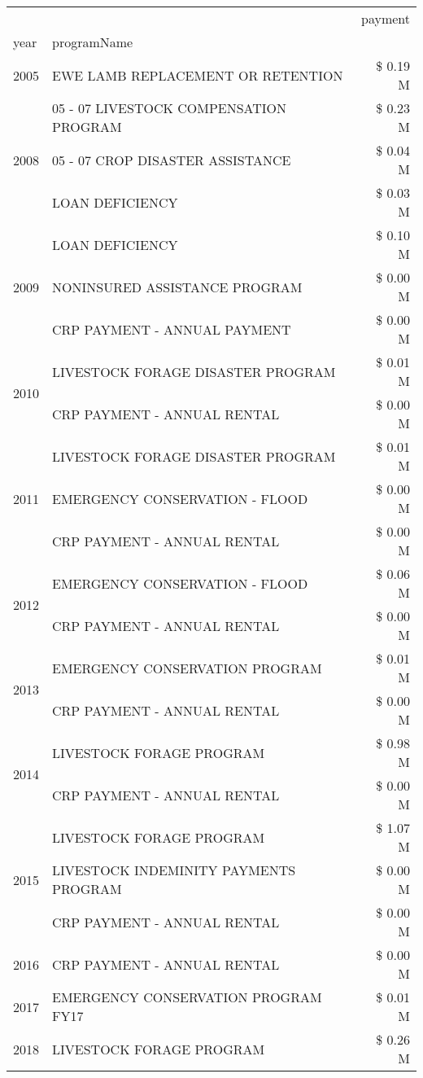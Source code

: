 \begin{tabular}{llr}
\toprule
 &  & payment \\
year & programName &  \\
\midrule
2005 & EWE LAMB REPLACEMENT OR RETENTION & \$ 0.19 M \\
\cline{1-3}
\multirow[t]{3}{*}{2008} & 05 - 07 LIVESTOCK COMPENSATION PROGRAM & \$ 0.23 M \\
 & 05 - 07 CROP DISASTER ASSISTANCE & \$ 0.04 M \\
 & LOAN DEFICIENCY & \$ 0.03 M \\
\cline{1-3}
\multirow[t]{3}{*}{2009} & LOAN DEFICIENCY & \$ 0.10 M \\
 & NONINSURED ASSISTANCE PROGRAM & \$ 0.00 M \\
 & CRP PAYMENT - ANNUAL PAYMENT & \$ 0.00 M \\
\cline{1-3}
\multirow[t]{2}{*}{2010} & LIVESTOCK FORAGE DISASTER PROGRAM & \$ 0.01 M \\
 & CRP PAYMENT - ANNUAL RENTAL & \$ 0.00 M \\
\cline{1-3}
\multirow[t]{3}{*}{2011} & LIVESTOCK FORAGE DISASTER PROGRAM & \$ 0.01 M \\
 & EMERGENCY CONSERVATION - FLOOD & \$ 0.00 M \\
 & CRP PAYMENT - ANNUAL RENTAL & \$ 0.00 M \\
\cline{1-3}
\multirow[t]{2}{*}{2012} & EMERGENCY CONSERVATION - FLOOD & \$ 0.06 M \\
 & CRP PAYMENT - ANNUAL RENTAL & \$ 0.00 M \\
\cline{1-3}
\multirow[t]{2}{*}{2013} & EMERGENCY CONSERVATION PROGRAM & \$ 0.01 M \\
 & CRP PAYMENT - ANNUAL RENTAL & \$ 0.00 M \\
\cline{1-3}
\multirow[t]{2}{*}{2014} & LIVESTOCK FORAGE PROGRAM & \$ 0.98 M \\
 & CRP PAYMENT - ANNUAL RENTAL & \$ 0.00 M \\
\cline{1-3}
\multirow[t]{3}{*}{2015} & LIVESTOCK FORAGE PROGRAM & \$ 1.07 M \\
 & LIVESTOCK INDEMINITY PAYMENTS PROGRAM & \$ 0.00 M \\
 & CRP PAYMENT - ANNUAL RENTAL & \$ 0.00 M \\
\cline{1-3}
2016 & CRP PAYMENT - ANNUAL RENTAL & \$ 0.00 M \\
\cline{1-3}
2017 & EMERGENCY CONSERVATION PROGRAM FY17 & \$ 0.01 M \\
\cline{1-3}
\multirow[t]{2}{*}{2018} & LIVESTOCK FORAGE PROGRAM & \$ 0.26 M \\

\end{tabular}
